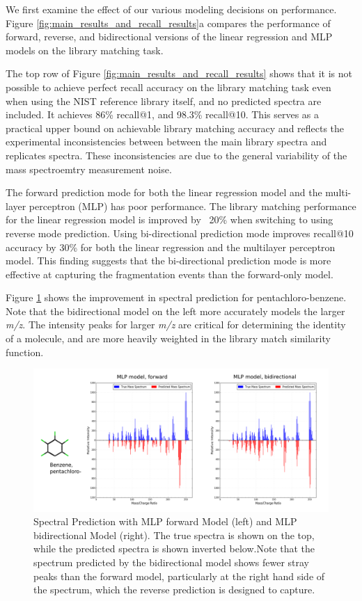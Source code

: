 \documentclass{article}
\begin{document}
We first examine the effect of our various modeling decisions on performance. Figure \ref{fig:main_results_and_recall_results}a compares the performance of forward, reverse, and bidirectional versions of the linear regression and MLP models on the library matching task. 

The top row of Figure \ref{fig:main_results_and_recall_results} shows that it is not possible to achieve perfect recall accuracy on the library matching task even when using the NIST reference library itself, and no predicted spectra are included.
It achieves 86\% recall@1, and 98.3\% recall@10. This serves as a practical upper bound on achievable library matching accuracy and reflects the experimental inconsistencies between between the main library spectra and replicates spectra. These inconsistencies are due to the general variability of the mass spectroemtry measurement noise. 

The forward prediction mode for both the linear regression model and the multi-layer perceptron (MLP) has poor performance. The library matching performance for the linear regression model is improved by ~20\% when switching to using  reverse mode prediction. Using  bi-directional prediction mode improves  recall@10 accuracy by 30\% for both the linear regression and the multilayer perceptron model. This finding suggests that the bi-directional prediction mode is more effective at capturing the fragmentation events than the forward-only model.

Figure \ref{fig:MLP_improvement_spectra} shows the improvement in spectral prediction for pentachloro-benzene. Note that the bidirectional model on the left more accurately models the larger \textit{m/z}. The intensity peaks for larger \textit{m/z} are critical for determining the identity of a molecule, and are more heavily weighted in the library match similarity function.

\begin{figure}[h]
    \centering
    \includegraphics[width=0.8\linewidth]{./figures/CEOCDNVZRAIOQZ-UHFFFAOYSA-N_mlp_model_spectra.png}
        \caption[Sample Spectra Prediction]{Spectral Prediction with MLP forward Model (left) and MLP bidirectional Model (right). The true spectra is shown on the top, while the predicted spectra is shown inverted below.\footnotemark Note that the spectrum predicted by the bidirectional model shows fewer stray peaks than the forward model, particularly at the right hand side of the spectrum, which the reverse prediction is designed to capture.}
    \label{fig:MLP_improvement_spectra}
\end{figure}
\end{document}
